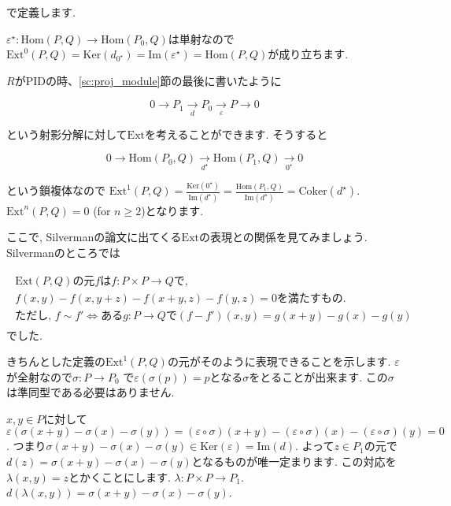 \documentclass{jsarticle}
\def\Im{\mathrm{Im}}
\def\Ker{\mathrm{Ker}}
\def\Hom{\mathrm{Hom}}
\def\Ext{\mathrm{Ext}}
\def\Coker{\mathrm{Coker}}
\theoremstyle{definition}
\numberwithin{theorem}{section}
\begin{document}
で定義します. 

$\varepsilon^\star: \Hom(P, Q) \rightarrow \Hom(P_0, Q)$は単射なので
$\Ext^0(P, Q) = \Ker(d_{0^\star}) = \Im(\varepsilon^\star) = \Hom(P, Q)$が成り立ちます.

$R$がPIDの時、\ref{sc:proj_module}節の最後に書いたように

\begin{equation*}
0 \rightarrow P_1 \xrightarrow[d]{} P_0 \xrightarrow[\varepsilon]{} P \rightarrow 0
\end{equation*}

という射影分解に対して$\Ext$を考えることができます. そうすると

\begin{equation*}
0 \rightarrow \Hom(P_0, Q) \xrightarrow[d^\star]{} \Hom(P_1, Q) \xrightarrow[0^\star]{} 0
\end{equation*}

という鎖複体なので
$\displaystyle \Ext^1(P, Q) = \frac{\Ker(0^\star)}{\Im(d^\star)} = \frac{\Hom(P_1, Q)}{\Im(d^\star)} = \Coker(d^\star)$.
$\Ext^n(P, Q) = 0$ (for $n \geq 2$)となります. 

ここで, Silvermanの論文に出てくる$\Ext$の表現との関係を見てみましょう. Silvermanのところでは

\begin{eqnarray}
\label{eq:silverman_ext_def}
\begin{array}{c}
\Ext(P, Q)\mbox{の元}fはf: P\times P \rightarrow Qで, \\
f(x, y) - f(x, y+z) - f(x+y, z) - f(y, z) = 0\mbox{を満たすもの.}\\
\mbox{ただし, }f\sim f' \Leftrightarrow ある g:P\rightarrow Qで(f-f')(x, y) = g(x+y) - g(x) - g(y)
\end{array}
\end{eqnarray}
でした.

きちんとした定義の$\Ext^1(P, Q)$の元がそのように表現できることを示します. $\varepsilon$が全射なので$\sigma : P \rightarrow P_0$
で$\varepsilon(\sigma(p)) = p$となる$\sigma$をとることが出来ます. この$\sigma$は準同型である必要はありません.

$x, y \in P$に対して
$\varepsilon(\sigma(x+y) - \sigma(x) - \sigma(y)) = (\varepsilon\circ\sigma)(x+y) - (\varepsilon\circ\sigma)(x) - (\varepsilon\circ\sigma)(y) = 0$.
つまり$\sigma(x+y) - \sigma(x) - \sigma(y) \in \Ker(\varepsilon) = \Im(d)$. よって$z\in P_1$の元で
$d(z) = \sigma(x+y) - \sigma(x) - \sigma(y)$となるものが唯一定まります. この対応を$\lambda(x, y) = z$とかくことにします.
$\lambda: P\times P \rightarrow P_1$. $d(\lambda(x, y)) = \sigma(x+y) - \sigma(x) - \sigma(y)$.
\end{document}
